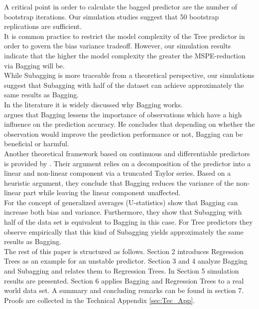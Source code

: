 A critical point in order to calculate the bagged predictor are the number of bootstrap iterations. 
Our simulation studies suggest that 50 bootstrap replications are sufficient.\\ 
It is common practice to restrict the model complexity of the Tree predictor in order to govern the bias variance tradeoff. However, our simulation results indicate that the higher the model complexity the greater the MSPE-reduction via Bagging will be.\\
While Subagging is more traceable from a theoretical perspective, our simulations suggest that Subagging with half of the dataset can achieve approximately the same results as Bagging.\\
In the literature it is widely discussed why Bagging works. \\
\cite{Grandvalet2004} argues that Bagging lessens the importance of observations which have a high influence on the prediction accuracy.
He concludes that depending on whether the observation would improve the prediction performance or not, Bagging can be beneficial or harmful.\\
Another theoretical framework based on continuous and differentiable predictors is provided by \cite{friedman2007}.
Their argument relies on a decomposition of the predictor into a linear and non-linear component via a truncated Taylor series.
Based on a heuristic argument, they conclude that Bagging reduces the variance of the non-linear part while leaving the linear component unaffected.\\
For the concept of generalized averages (U-statistics) \cite{buja2006} show that Bagging can increase both bias and variance.
Furthermore, they show that Subagging with half of the data set is equivalent to Bagging in this case.
For Tree predictors they observe empirically that this kind of Subagging yields approximately the same results as Bagging.\\
The rest of this paper is structured as follows.
Section 2 introduces Regression Trees as an example for an unstable predictor. Section 3 and 4 analyze Bagging and Subagging and relates them to Regression Trees.
In Section 5 simulation results are presented. Section 6 applies Bagging and Regression Trees to a real world data set.
A summary and concluding remarks can be found in section 7. Proofs are collected in the Technical Appendix \ref{sec:Tec_App}.

